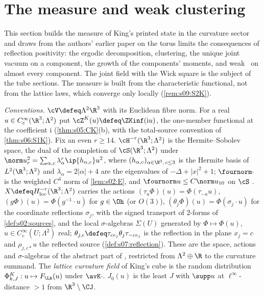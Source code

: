 \section{The measure and weak clustering}

This section builds the measure of King's printed state in the curvature sector and draws from the authors' earlier paper on the torus limits \cite{SymPhase} the consequences of reflection positivity: the ergodic decomposition, clustering, the unique joint vacuum on a component, the growth of the components' moments, and weak \OSf\ on almost every component. The joint field with the Wick square is the subject of the tube sections. The measure is built from the characteristic functional, not from the lattice laws, which converge only locally (\cref{rem:s09:S2K}).

\emph{Conventions.} $\cV\defeq\Lambda^2\R^3$ with its Euclidean fibre norm. For a real $u\in C^\infty_c(\R^3;\Lambda^2)$ put $\cZ^K(u)\defeq\ZKinf(\mathrm iu)$, the one-member functional at the coefficient $\mathrm i$ (\cref{thm:s05:CK}(b), with the total-source convention of \cref{thm:s06:S1K}). Fix an even $r\ge14$. $\cH^{-r}(\R^3;\Lambda^2)$ is the Hermite--Sobolev space, the dual of the completion of $\cS(\R^3;\Lambda^2)$ under $\norm u_r^2=\sum_{\alpha,c}\lambda_\alpha^{r}\ip{h_{\alpha,c}}u^2$, where $(h_{\alpha,c})_{\alpha\in\N^3,\,c\le3}$ is the Hermite basis of $L^2(\R^3;\Lambda^2)$ and $\lambda_\alpha=2|\alpha|+4$ are the eigenvalues of $-\Delta+|x|^2+1$; $\fournorm\cdot$ is the weighted $C^4$ norm of \cref{lem:s02:E}, and $\fournorm u\le C\norm u_{10}$ on $\cS$ \cite[lem:D:hermite(a)]{SymPhase}. $X\defeq H^{-r}_{\mathrm{loc}}(\R^3;\Lambda^2)$ carries the actions $(\tau_a\Phi)(u)=\Phi(\tau_{-a}u)$, $(g\Phi)(u)=\Phi(g^{-1}\cdot u)$ for $g\in\Oh$ (or $O(3)$), $(\theta_j\Phi)(u)=\Phi(\sigma_j\cdot u)$ for the coordinate reflections $\sigma_j$, with the signed transport of $2$-forms of \cref{def:s02:sources}, and the local $\sigma$-algebras $\Sigma(U)$ generated by $\Phi\mapsto\Phi(u)$, $u\in C^\infty_c(U;\Lambda^2)$ real; $\theta_{j,c}\defeq\tau_{ce_j}\theta_j\tau_{-ce_j}$ is the reflection in the plane $x_j=c$ and $\rho_{j,c*}u$ the reflected source (\cref{def:s07:reflection}). These are the space, actions and $\sigma$-algebras of the abstract part of \cite{SymPhase}, restricted from $\Lambda^2\oplus\R$ to the curvature summand. The \emph{lattice curvature field} of King's cube is the random distribution $\Phi^K_{k,J}:u\mapsto F_{\Lk}(u)$ under $\avK\cdot$. $J_0(u)$ is the least $J$ with $\supp u$ at $\ell^\infty$-distance $>1$ from $\R^3\setminus\CJ$.

